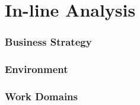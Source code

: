 \part{In-line Analysis}


\section{Business Strategy}

\section{Environment}

\section{Work Domains}


